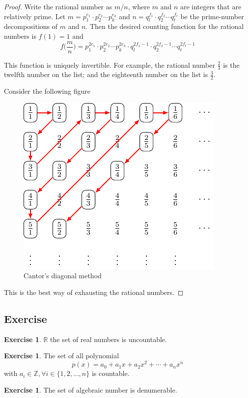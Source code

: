 \documentclass[	DIV=calc,paper=a4,fontsize=11pt]{scrartcl}	 	%
\theoremstyle{definition}
\newtheorem{exer}[thm]{Exercise}
\theoremstyle{plain}
\theoremstyle{remark}
\begin{document}
\begin{proof}
Write the rational number as $m/n$, where $m$ and $n$ are integers that are relatively prime. Let $m = p_1^{e_1}\cdot p_2^{e_2}\cdots p_k^{e_k}$ and $n = q_l^{f_1} \cdot q_2^{f_2}\cdots q_t^{f_t}$ be the prime-number decompositions of $m$ and $n$. Then the desired counting function for the rational numbers is $f(1) = 1$
and
\[f\biggl(\frac{m}{n}\biggl)=p_1^{2e_1}\cdot p_2^{2e_2}\cdots p_k^{2e_k}\cdot q_l^{2f_1-1} \cdot q_2^{2f_2-1}\cdots q_t^{2f_t-1}\]

This function is uniquely invertible. For example, the rational number $\frac{2}{3}$ is the twelfth number on the list; and the eighteenth number on the list is $\frac{3}{2}$.

\medskip

Consider the following figure
\begin{figure}[hbt!]
\centering
\includegraphics[width=.4\textwidth]{rational}
\caption{Cantor's diagonal method}
\end{figure}

This is the best way of exhausting the rational numbers.
\end{proof}

\newpage
\subsection{Exercise}
\begin{exer}\label{001}
$\mathbb{R}$ the set of real numbers is uncountable.
\end{exer}

\begin{exer}\label{002}
The set of all polynomial
  \[ p(x)=a_0+a_1x+a_2x^2+\cdots+a_nx^n\]
with $a_i\in\mathbb{Z}, \forall i\in\{1,2,\ldots,n\}$ is countable.
\end{exer}

\begin{exer}\label{003}
The set of algebraic number is denumerable.
\end{exer}
\end{document}
